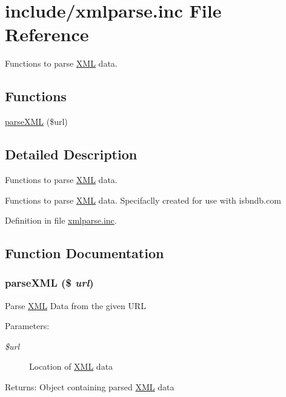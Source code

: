 \hypertarget{xmlparse_8inc}{
\section{include/xmlparse.inc File Reference}
\label{xmlparse_8inc}
}
Functions to parse \hyperlink{classXML}{XML} data. 

\subsection*{Functions}
\begin{CompactItemize}
\item 
\hyperlink{xmlparse_8inc_2ee17c038e8fe8a1ddc86bb533863cb7}{parseXML} (\$url)
\end{CompactItemize}


\subsection{Detailed Description}
Functions to parse \hyperlink{classXML}{XML} data. 

Functions to parse \hyperlink{classXML}{XML} data. Specifaclly created for use with isbndb.com 

Definition in file \hyperlink{xmlparse_8inc-source}{xmlparse.inc}.

\subsection{Function Documentation}
\hypertarget{xmlparse_8inc_2ee17c038e8fe8a1ddc86bb533863cb7}{
\subsubsection{\setlength{\rightskip}{0pt plus 5cm}parseXML (\$ {\em url})}}
\label{xmlparse_8inc_2ee17c038e8fe8a1ddc86bb533863cb7}


Parse \hyperlink{classXML}{XML} Data from the given URL \begin{Desc}
\item[Parameters:]
\begin{description}
\item[{\em \$url}]Location of \hyperlink{classXML}{XML} data \end{description}
\end{Desc}
\begin{Desc}
\item[Returns:]Object containing parsed \hyperlink{classXML}{XML} data \end{Desc}


